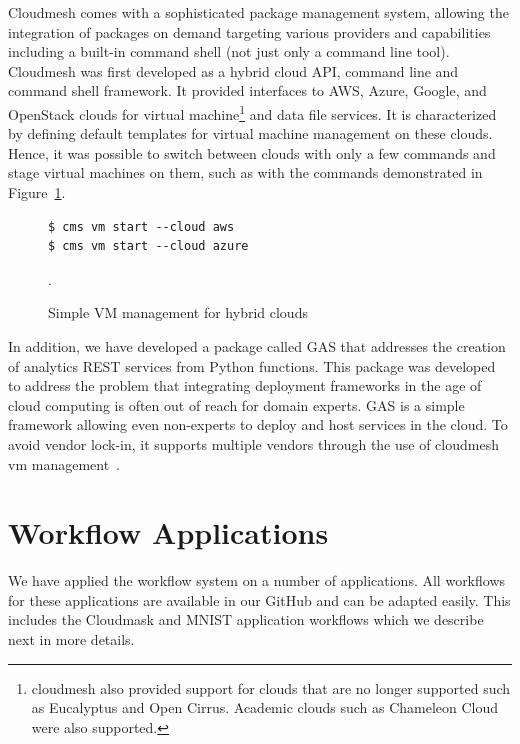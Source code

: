 \documentclass[sigplan,screen]{acmart}
\newcommand{\FILE}[1]{}
\begin{document}
Cloudmesh comes with a sophisticated package management system,
allowing the integration of packages on demand targeting various providers
and capabilities including a built-in command shell (not just only
a command line tool). Cloudmesh was first developed as a hybrid cloud
API, command line and command shell framework. It provided interfaces
to AWS, Azure, Google, and OpenStack clouds for virtual
machine\footnote{cloudmesh also provided support for clouds that are no
longer supported such as Eucalyptus and Open Cirrus. Academic clouds
such as Chameleon Cloud were also supported.} and data file services. It
is characterized by defining default templates for virtual machine
management on these clouds. Hence, it was possible to switch between clouds
with only a few commands and stage virtual machines on them, such
as with the commands demonstrated in Figure~\ref{fig:cms}.

\begin{figure}[htb]

{\scriptsize\begin{verbatim}
$ cms vm start --cloud aws
$ cms vm start --cloud azure
\end{verbatim}}

  \caption{Simple VM management for hybrid clouds}
\label{fig:cms}.
\end{figure}  

In addition, we have developed a package called GAS that addresses
the creation of analytics REST services from Python functions. This
package was developed to address the problem that integrating
deployment frameworks in the age of cloud computing is often out of
reach for domain experts. GAS is a simple framework allowing even
non-experts to deploy and host services in the cloud. To avoid vendor
lock-in, it supports multiple vendors through the use of cloudmesh vm
management~\cite{las21-gas}.


% 
\FILE{applications.tex}

\section{Workflow Applications}

We have applied the workflow system on a number of applications. All
workflows for these applications are available in our GitHub and can
be adapted easily. This includes the Cloudmask and MNIST application
workflows which we describe next in more details.
\end{document}
